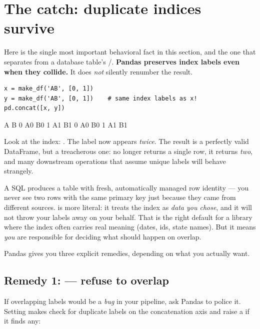 \documentclass[11pt]{article}
\begin{document}
\section{The catch: duplicate indices survive}

Here is the single most important behavioral fact in this section, and the one that separates  from a database table's /. \textbf{Pandas preserves index labels even when they collide.} It does \emph{not} silently renumber the result.

\begin{lstlisting}
x = make_df('AB', [0, 1])
y = make_df('AB', [0, 1])    # same index labels as x!
pd.concat([x, y])
\end{lstlisting}

\begin{outblock}
    A   B
0  A0  B0
1  A1  B1
0  A0  B0
1  A1  B1
\end{outblock}

Look at the index: . The label  now appears \emph{twice}. The result is a perfectly valid DataFrame, but a treacherous one:  no longer returns a single row, it returns \emph{two}, and many downstream operations that assume unique labels will behave strangely.

\begin{keyidea}
A SQL  produces a table with fresh, automatically managed row identity --- you never see two rows with the same primary key just because they came from different sources.  is more literal: it treats the index as \emph{data you chose}, and it will not throw your labels away on your behalf. That is the right default for a library where the index often carries real meaning (dates, ids, state names). But it means \emph{you} are responsible for deciding what should happen on overlap.
\end{keyidea}

Pandas gives you three explicit remedies, depending on what you actually want.

\subsection{Remedy 1: \texorpdfstring{}{verify integrity} --- refuse to overlap}

If overlapping labels would be a \emph{bug} in your pipeline, ask Pandas to police it. Setting  makes  check for duplicate labels on the concatenation axis and raise a  if it finds any:
\end{document}
